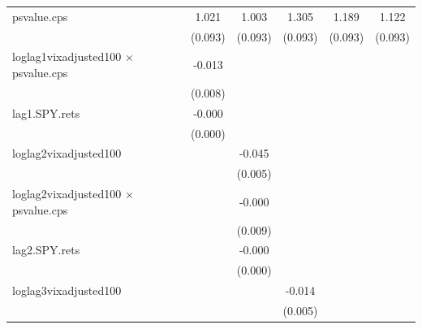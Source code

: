 \documentclass[11pt,a4paper,oldfontcommands]{memoir}
\begin{document}
{\begin{footnotesize}
\begin{tiny}
\begin{longtable}{l*{5}{c}}
psvalue.cps         &       1.021\sym{***}&       1.003\sym{***}&       1.305\sym{***}&       1.189\sym{***}&       1.122\sym{***}\\
                    &     (0.093)         &     (0.093)         &     (0.093)         &     (0.093)         &     (0.093)         \\
 
loglag1vixadjusted100 $\times$ psvalue.cps&      -0.013         &                     &                     &                     &                     \\
                    &     (0.008)         &                     &                     &                     &                     \\
 
lag1.SPY.rets       &      -0.000         &                     &                     &                     &                     \\
                    &     (0.000)         &                     &                     &                     &                     \\

 
loglag2vixadjusted100&                     &      -0.045\sym{***}&                     &                     &                     \\
                    &                     &     (0.005)         &                     &                     &                     \\
 
loglag2vixadjusted100 $\times$ psvalue.cps&                     &      -0.000         &                     &                     &                     \\
                    &                     &     (0.009)         &                     &                     &                     \\
 
lag2.SPY.rets       &                     &      -0.000\sym{***}&                     &                     &                     \\
                    &                     &     (0.000)         &                     &                     &                     \\
 
loglag3vixadjusted100&                     &                     &      -0.014\sym{**} &                     &                     \\
                    &                     &                     &     (0.005)         &                     &                     \\
 

\end{longtable}
\end{tiny}
\end{footnotesize}}
\end{document}
